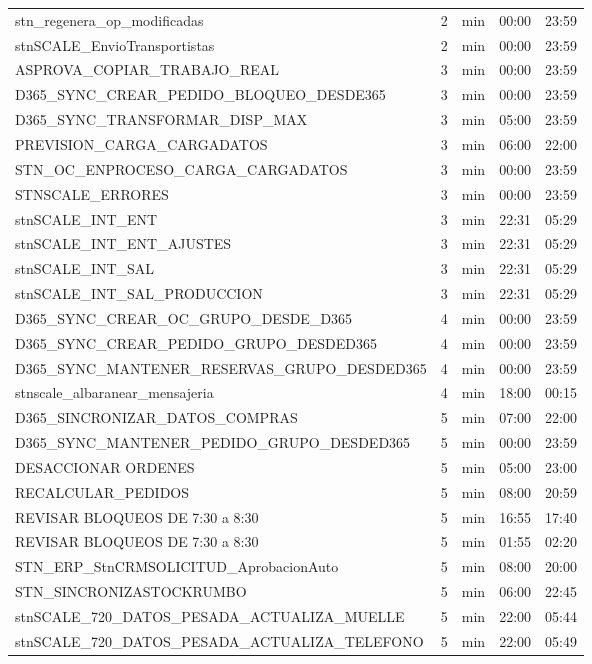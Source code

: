 \documentclass[11pt,a4paper]{article}
\begin{document}
\begin{longtable}{p{8.3cm}rp{1.2cm}p{1.5cm}p{1.5cm}}
stn\_regenera\_op\_modificadas & 2 & min & 00:00 & 23:59 \\
stnSCALE\_EnvioTransportistas & 2 & min & 00:00 & 23:59 \\
ASPROVA\_COPIAR\_TRABAJO\_REAL & 3 & min & 00:00 & 23:59 \\
D365\_SYNC\_CREAR\_PEDIDO\_BLOQUEO\_DESDE365 & 3 & min & 00:00 & 23:59 \\
D365\_SYNC\_TRANSFORMAR\_DISP\_MAX & 3 & min & 05:00 & 23:59 \\
PREVISION\_CARGA\_CARGADATOS & 3 & min & 06:00 & 22:00 \\
STN\_OC\_ENPROCESO\_CARGA\_CARGADATOS & 3 & min & 00:00 & 23:59 \\
STNSCALE\_ERRORES & 3 & min & 00:00 & 23:59 \\
stnSCALE\_INT\_ENT & 3 & min & 22:31 & 05:29 \\
stnSCALE\_INT\_ENT\_AJUSTES & 3 & min & 22:31 & 05:29 \\
stnSCALE\_INT\_SAL & 3 & min & 22:31 & 05:29 \\
stnSCALE\_INT\_SAL\_PRODUCCION & 3 & min & 22:31 & 05:29 \\
D365\_SYNC\_CREAR\_OC\_GRUPO\_DESDE\_D365 & 4 & min & 00:00 & 23:59 \\
D365\_SYNC\_CREAR\_PEDIDO\_GRUPO\_DESDED365 & 4 & min & 00:00 & 23:59 \\
D365\_SYNC\_MANTENER\_RESERVAS\_GRUPO\_DESDED365 & 4 & min & 00:00 & 23:59 \\
stnscale\_albaranear\_mensajeria & 4 & min & 18:00 & 00:15 \\
D365\_SINCRONIZAR\_DATOS\_COMPRAS & 5 & min & 07:00 & 22:00 \\
D365\_SYNC\_MANTENER\_PEDIDO\_GRUPO\_DESDED365 & 5 & min & 00:00 & 23:59 \\
DESACCIONAR ORDENES & 5 & min & 05:00 & 23:00 \\
RECALCULAR\_PEDIDOS & 5 & min & 08:00 & 20:59 \\
REVISAR BLOQUEOS DE 7:30 a 8:30 & 5 & min & 16:55 & 17:40 \\
REVISAR BLOQUEOS DE 7:30 a 8:30 & 5 & min & 01:55 & 02:20 \\
STN\_ERP\_StnCRMSOLICITUD\_AprobacionAuto & 5 & min & 08:00 & 20:00 \\
STN\_SINCRONIZASTOCKRUMBO & 5 & min & 06:00 & 22:45 \\
stnSCALE\_720\_DATOS\_PESADA\_ACTUALIZA\_MUELLE & 5 & min & 22:00 & 05:44 \\
stnSCALE\_720\_DATOS\_PESADA\_ACTUALIZA\_TELEFONO & 5 & min & 22:00 & 05:49 \\

\end{longtable}
\end{document}
